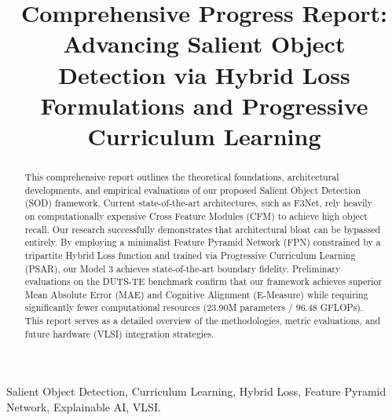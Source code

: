 \documentclass[10pt,conference,twocolumn]{IEEEtran}
\begin{document}
\title{Comprehensive Progress Report: Advancing Salient Object Detection via Hybrid Loss Formulations and Progressive Curriculum Learning}

\author{
\and
{}
\and
{}
}

\maketitle

\begin{abstract}
This comprehensive report outlines the theoretical foundations, architectural developments, and empirical evaluations of our proposed Salient Object Detection (SOD) framework. Current state-of-the-art architectures, such as F3Net, rely heavily on computationally expensive Cross Feature Modules (CFM) to achieve high object recall. Our research successfully demonstrates that architectural bloat can be bypassed entirely. By employing a minimalist Feature Pyramid Network (FPN) constrained by a tripartite Hybrid Loss function and trained via Progressive Curriculum Learning (PSAR), our Model 3 achieves state-of-the-art boundary fidelity. Preliminary evaluations on the DUTS-TE benchmark confirm that our framework achieves superior Mean Absolute Error (MAE) and Cognitive Alignment (E-Measure) while requiring significantly fewer computational resources (23.90M parameters / 96.48 GFLOPs). This report serves as a detailed overview of the methodologies, metric evaluations, and future hardware (VLSI) integration strategies.
\end{abstract}

\begin{IEEEkeywords}
Salient Object Detection, Curriculum Learning, Hybrid Loss, Feature Pyramid Network, Explainable AI, VLSI.
\end{IEEEkeywords}
\end{document}
